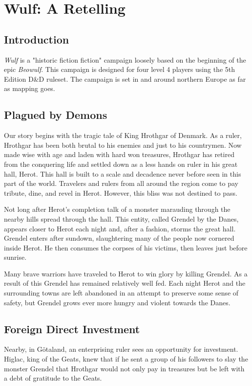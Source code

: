 \documentclass[10pt,twoside,twocolumn,openany]{book}
\begin{document}
\selectfont %


\chapter{Wulf: A Retelling}

\section{Introduction}
\textit{Wulf} is a "historic fiction fiction" campaign loosely based on the beginning of the epic \textit{Beowulf}. This campaign is designed for four level 4 players using the 5th Edition D\&D ruleset. The campaign is set in and around northern Europe as far as mapping goes.

\section{Plagued by Demons}
Our story begins with the tragic tale of King Hrothgar of Denmark. As a ruler, Hrothgar has been both brutal to his enemies and just to his countrymen. Now made wise with age and laden with hard won treasures, Hrothgar has retired from the conquering life and settled down as a less hands on ruler in his great hall, Herot. This hall is built to a scale and decadence never before seen in this part of the world. Travelers and rulers from all around the region come to pay tribute, dine, and revel in Herot. However, this bliss was not destined to pass. 

Not long after Herot's completion talk of a monster marauding through the nearby hills spread through the hall. This entity, called Grendel by the Danes, appears closer to Herot each night and, after a fashion, storms the great hall. Grendel enters after sundown, slaughtering many of the people now cornered inside Herot. He then consumes the corpses of his victims, then leaves just before sunrise.

Many brave warriors have traveled to Herot to win glory by killing Grendel. As a result of this Grendel has remained relatively well fed. Each night Herot and the surrounding towns are left abandoned in an attempt to preserve some sense of safety, but Grendel grows ever more hungry and violent towards the Danes.

\section{Foreign Direct Investment}
Nearby, in G{\"o}taland, an enterprising ruler sees an opportunity for investment. Higlac, king of the Geats, knew that if he sent a group of his followers to slay the monster Grendel that Hrothgar would not only pay in treasures but be left with a debt of gratitude to the Geats.
\end{document}
